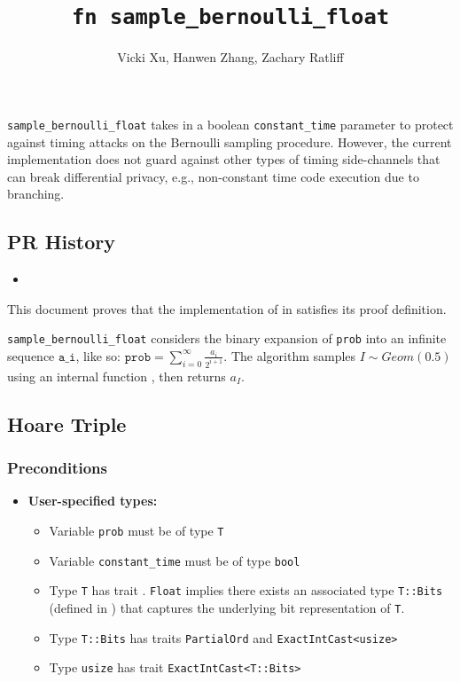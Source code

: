 \documentclass{article}
\title{\texttt{fn sample\_bernoulli\_float}}
\author{Vicki Xu, Hanwen Zhang, Zachary Ratliff}
\begin{document}
\maketitle

\contrib
\begin{tcolorbox}
    \begin{warning}
     \texttt{sample\_bernoulli\_float} takes in a boolean \texttt{constant\_time} parameter to protect against timing attacks on the Bernoulli sampling procedure. However, the current implementation does not guard against other types of timing side-channels that can break differential privacy, e.g., non-constant time code execution due to branching.
    \end{warning}
\end{tcolorbox}

\subsection*{PR History}
\begin{itemize}
    \item {}
\end{itemize}

This document proves that the implementation of  in  
satisfies its proof definition.

\texttt{sample\_bernoulli\_float} considers the binary expansion of \texttt{prob} into an infinite sequence $\texttt{a\_i}$, 
like so: $\texttt{prob} = \sum_{i = 0}^{\infty} \frac{a_i}{2^{i + 1}}$. 
The algorithm samples $I \sim Geom(0.5)$ using an internal function , then returns $a_I$. 

\subsection{Hoare Triple}
\subsubsection*{Preconditions}
\begin{itemize}
    \item \textbf{User-specified types:}
    \begin{itemize}
        \item Variable \texttt{prob} must be of type \texttt{T}
        \item Variable \texttt{constant\_time} must be of type \texttt{bool}
        \item Type \texttt{T} has trait . 
            \texttt{Float} implies there exists an associated type \texttt{T::Bits} (defined in ) that captures the underlying bit representation of \texttt{T}.
        \item Type \texttt{T::Bits} has traits \texttt{PartialOrd} and \texttt{ExactIntCast<usize>}
        \item Type \texttt{usize} has trait \texttt{ExactIntCast<T::Bits>}
    \end{itemize}
\end{itemize}
\end{document}
